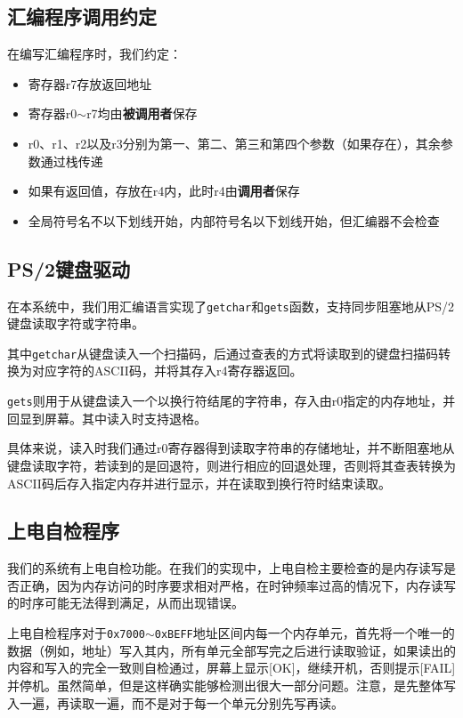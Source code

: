 \documentclass[11pt,utf8]{report}
\begin{document}
\subsection{汇编程序调用约定}
	\par 在编写汇编程序时，我们约定：
	\begin{itemize}
		\item 寄存器r7存放返回地址
		\item 寄存器r0$\sim$r7均由\textbf{被调用者}保存
		\item r0、r1、r2以及r3分别为第一、第二、第三和第四个参数（如果存在），其余参数通过栈传递
		\item 如果有返回值，存放在r4内，此时r4由\textbf{调用者}保存
		\item 全局符号名不以下划线开始，内部符号名以下划线开始，但汇编器不会检查
	\end{itemize}

\subsection{PS/2键盘驱动}
	在本系统中，我们用汇编语言实现了\texttt{getchar}和\texttt{gets}函数，支持同步阻塞地从PS/2键盘读取字符或字符串。

	其中\texttt{getchar}从键盘读入一个扫描码，后通过查表的方式将读取到的键盘扫描码转换为对应字符的ASCII码，并将其存入r4寄存器返回。

	\texttt{gets}则用于从键盘读入一个以换行符结尾的字符串，存入由r0指定的内存地址，并回显到屏幕。其中读入时支持退格。

	具体来说，读入时我们通过r0寄存器得到读取字符串的存储地址，并不断阻塞地从键盘读取字符，若读到的是回退符，则进行相应的回退处理，否则将其查表转换为ASCII码后存入指定内存并进行显示，并在读取到换行符时结束读取。

\subsection{上电自检程序}
	\par 我们的系统有上电自检功能。在我们的实现中，上电自检主要检查的是内存读写是否正确，因为内存访问的时序要求相对严格，在时钟频率过高的情况下，内存读写的时序可能无法得到满足，从而出现错误。
	
	\par 上电自检程序对于\texttt{0x7000}$\sim$\texttt{0xBEFF}地址区间内每一个内存单元，首先将一个唯一的数据（例如，地址）写入其内，所有单元全部写完之后进行读取验证，如果读出的内容和写入的完全一致则自检通过，屏幕上显示[OK]，继续开机，否则提示[FAIL]并停机。虽然简单，但是这样确实能够检测出很大一部分问题。注意，是先整体写入一遍，再读取一遍，而不是对于每一个单元分别先写再读。
\end{document}
